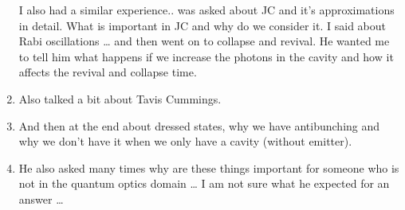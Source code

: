\documentclass{article}%
\begin{document}
\begin{enumerate}
I also had a similar experience.. was asked about JC and it’s approximations in detail. What is important in JC and why do we consider it. I said about Rabi oscillations … and then went on to collapse and revival. He wanted me to tell him what happens if we increase the photons in the cavity and how it affects the revival and collapse time. %
\item%
Also talked a bit about Tavis Cummings. %
\item%
And then at the end about dressed states, why we have antibunching and why we don’t have it when we only have a cavity (without emitter). %
\item%
He also asked many times why are these things important for someone who is not in the quantum optics domain … I am not sure what he expected for an answer …%
\end{enumerate}%
\end{document}
